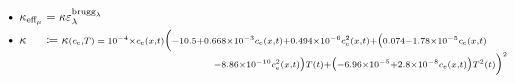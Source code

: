 \begin{table}[p]
\begin{minipage}{\textwidth}
\begin{flushleft}
        \\
        \makeatletter\def\f@size{14}\check@mathfonts
        $\begin{alignedat}{2}
            & \text{\textbullet{} } \kappa_\effmu & & = \kappa \varepsilon_\lambda^{\text{brugg}_\lambda} \\
            & \text{\textbullet{} } \kappa & & \coloneqq \kappa\scriptstyle{(c_\text{e},T)}\; = \; \parbox[t]{11.60cm}{$\scriptstyle 10^{-4} \times c_\text{e}(x,t)\Big(-10.5 + 0.668\times10^{-3} c_\text{e}(x,t) + 0.494\times10^{-6} c_\text{e}^2(x,t) + \big(0.074 - 1.78\times10^{-5}c_\text{e}(x,t)$ \\ \hspace*{\fill} $\scriptstyle - 8.86\times10^{-10}c_\text{e}^2(x,t)\big)T(t) + \big(-6.96\times10^{-5} + 2.8\times10^{-8} c_\text{e}(x,t)\big)T^2(t)\Big)^2$}\\
        \end{alignedat}$
    \end{flushleft}
\end{minipage}
\end{table}

